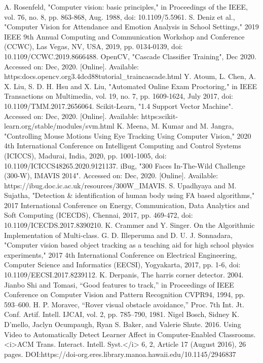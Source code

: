 \documentclass[conference]{IEEEtran}
\begin{document}
\begin{thebibliography}{00}
 A. Rosenfeld, "Computer vision: basic principles," in Proceedings of the IEEE, vol. 76, no. 8, pp. 863-868, Aug. 1988, doi: 10.1109/5.5961.
 S. Deniz et al., "Computer Vision for Attendance and Emotion Analysis in School Settings," 2019 IEEE 9th Annual Computing and Communication Workshop and Conference (CCWC), Las Vegas, NV, USA, 2019, pp. 0134-0139, doi: 10.1109/CCWC.2019.8666488.
 OpenCV, "Cascade Classifier Training", Dec 2020. Accessed on: Dec, 2020. [Online]. Available: https:\text{//}docs.opencv.org\text{/}3.4\text{/}dc\text{/}d88\text{/}tutorial\_traincascade.html
 Y. Atoum, L. Chen, A. X. Liu, S. D. H. Hsu and X. Liu, "Automated Online Exam Proctoring," in IEEE Transactions on Multimedia, vol. 19, no. 7, pp. 1609-1624, July 2017, doi: 10.1109/TMM.2017.2656064.
 Scikit-Learn, "1.4 Support Vector Machine". Accessed on: Dec, 2020. [Online]. Available: https:\text{//}scikit-learn.org/stable/modules/svm.html
 K. Meena, M. Kumar and M. Jangra, "Controlling Mouse Motions Using Eye Tracking Using Computer Vision," 2020 4th International Conference on Intelligent Computing and Control Systems (ICICCS), Madurai, India, 2020, pp. 1001-1005, doi: 10.1109/ICICCS48265.2020.9121137.
 iBug, "300 Faces In-The-Wild Challenge (300-W), IMAVIS 2014". Accessed on: Dec, 2020. [Online]. Available: https://ibug.doc.ic.ac.uk/resources/300\text{-}W\_IMAVIS.
 S. Upadhyaya and M. Sujatha, "Detection \& identification of human body using FA based algorithms," 2017 International Conference on Energy, Communication, Data Analytics and Soft Computing (ICECDS), Chennai, 2017, pp. 469-472, doi: 10.1109/ICECDS.2017.8390210.
 K. Crammer and Y. Singer. On the Algorithmic Implementation of Multi-class.
 G. D. Illeperuma and D. U. J. Sonnadara, "Computer vision based object tracking as a teaching aid for high school physics experiments," 2017 4th International Conference on Electrical Engineering, Computer Science and Informatics (EECSI), Yogyakarta, 2017, pp. 1-6, doi: 10.1109/EECSI.2017.8239112.
 K. Derpanis, The harris corner detector. 2004.
 Jianbo Shi and Tomasi, “Good features to track,” in Proceedings of IEEE Conference on Computer Vision and Pattern Recognition CVPR94, 1994, pp. 593–600.
 H. P. Moravec, “Rover visual obstacle avoidance,” Proc. 7th Int. Jt. Conf. Artif. Intell. IJCAI, vol. 2, pp. 785–790, 1981. 
 Nigel Bosch, Sidney K. D'mello, Jaclyn Ocumpaugh, Ryan S. Baker, and Valerie Shute. 2016. Using Video to Automatically Detect Learner Affect in Computer-Enabled Classrooms. <i>ACM Trans. Interact. Intell. Syst.</i> 6, 2, Article 17 (August 2016), 26 pages. DOI:https://doi-org.eres.library.manoa.hawaii.edu/10.1145/2946837
\end{thebibliography}
\vspace{12pt} 
\end{document}
